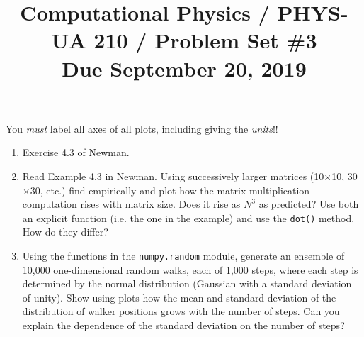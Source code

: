 \documentclass[11pt, preprint]{aastex}
\begin{document}
\title{\bf Computational Physics / PHYS-UA 210 / Problem Set \#3
\\ Due September 20, 2019}

You {\it must} label all axes of all plots, including giving the {\it
  units}!!

\begin{enumerate}
  \item Exercise 4.3 of Newman.

  \item Read Example 4.3 in Newman. Using successively larger matrices
    (10$\times$10, 30$\times$30, etc.) find empirically and plot how
    the matrix multiplication computation rises with matrix size. Does
    it rise as $N^3$ as predicted? Use both an explicit function
    (i.e. the one in the example) and use the {\tt dot()} method. How
    do they differ?

  \item Using the functions in the {\tt numpy.random} module, generate
    an ensemble of 10,000 one-dimensional random walks, each of 1,000
    steps, where each step is determined by the normal distribution
    (Gaussian with a standard deviation of unity). Show using plots
    how the mean and standard deviation of the distribution of walker
    positions grows with the number of steps. Can you explain the
    dependence of the standard deviation on the number of steps?

\end{enumerate}
\end{document}
